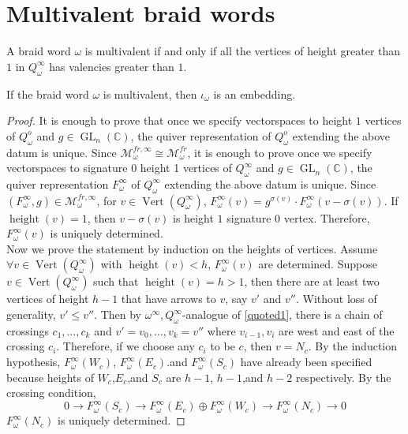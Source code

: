 \section{Multivalent braid words}                            
\begin{definition}
 A braid word $\omega$ is multivalent if and only if all the vertices of height greater than $1$ in $Q^\infty_\omega$ has valencies greater than $1$.
\end{definition}

\begin{theorem}
	If the braid word $\omega$ is multivalent, then $\iota_{\omega}$ is an embedding.
\end{theorem}
\begin{proof}
It is enough to prove that once we specify vectorspaces to height $1$ vertices of $Q^o_\omega$ and $g\in \operatorname{GL}_n(\mathbb{C})$, the quiver representation of $Q^o_\omega$ extending the above datum is unique. Since $\mathcal{M}_\omega^{fr,\infty}\cong \mathcal{M}_\omega^{fr}$, it is enough to prove once we specify vectorspaces to signature 0 height 1 vertices of $Q_\omega^\infty$ and $g\in \operatorname{GL}_n(\mathbb{C})$, the quiver representation $F_\omega^\infty$ of $Q_\omega^\infty$ extending the above datum is unique. Since $(F_\omega^\infty,g)\in \mathcal{M}_\omega^{fr,\infty}$, for $v\in \operatorname{Vert}(Q_\omega^\infty)$, $F_\omega^\infty(v) = g^{\sigma(v)}\cdot F_\omega^\infty(v-\sigma(v))$. If $\operatorname{height}(v)=1$, then $v-\sigma(v)$ is height $1$ signature $0$ vertex. Therefore, $F_\omega^\infty(v)$ is uniquely determined. \\
Now we prove the statement by induction on the heights of vertices. Assume $\forall v\in \operatorname{Vert}(Q_\omega^\infty)$ with $\operatorname{height}(v)<h$, $F_\omega^\infty(v)$ are determined. Suppose $v\in \operatorname{Vert}(Q_\omega^\infty)$ such that $\operatorname{height}(v)=h>1$, then there are at least two vertices of height $h-1$ that have arrows to $v$, say $v'$ and $v''$. Without loss of generality, $v'\leq v''$. Then by $\omega^\infty,Q_\omega^\infty$-analogue of \ref{quoted1}, there is a chain of crossings $c_1,\dots,c_k$ and $v'=v_0,\dots,v_k=v''$ where $v_{i-1},v_i$ are west and east of the crossing $c_i$. Therefore, if we choose any $c_i$ to be $c$, then $v=N_c$. By the induction hypothesis, $F_\omega^\infty(W_c)$, $F_\omega^\infty(E_c)$.and $F_\omega^\infty(S_c)$ have already been specified because heights of $W_c$,$E_c$,and $S_c$ are $h-1$, $h-1$,and $h-2$ respectively. By the crossing condition,
\[
0\rightarrow F_\omega^\infty(S_c)\rightarrow F_\omega^\infty(E_c)\oplus F_\omega^\infty(W_c) \rightarrow F_\omega^\infty(N_c)\rightarrow 0
\]
$F_\omega^\infty(N_c)$ is uniquely determined.
\end{proof}

